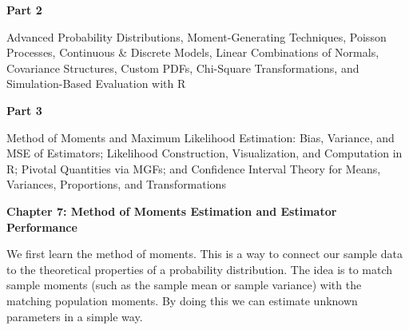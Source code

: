 \documentclass[11pt,letterpaper]{article}
\theoremstyle{remark}
\begin{document}
\newpage


\newpage

\thispagestyle{empty}
\vspace*{\fill}
\begin{center}
{\fontsize{80}{96}\selectfont \textbf{Part 2}}

\vspace{1cm}

{\large Advanced Probability Distributions, Moment-Generating Techniques, Poisson Processes, Continuous \& Discrete Models, Linear Combinations of Normals, Covariance Structures, Custom PDFs, Chi-Square Transformations, and Simulation-Based Evaluation with R}
\end{center}
\vspace*{\fill}

\newpage


\newpage

\thispagestyle{empty}
\vspace*{\fill}
\begin{center}
{\fontsize{80}{96}\selectfont \textbf{Part 3}}

\vspace{1cm}

{\large Method of Moments and Maximum Likelihood Estimation: Bias, Variance, and MSE of Estimators; Likelihood Construction, Visualization, and Computation in R; Pivotal Quantities via MGFs; and Confidence Interval Theory for Means, Variances, Proportions, and Transformations}
\end{center}
\vspace*{\fill}

\newpage


\textbf{Chapter 7: Method of Moments Estimation and Estimator Performance}

\vspace{0.5cm}

We first learn the method of moments. This is a way to connect our sample data to the theoretical properties of a probability distribution. The idea is to match sample moments (such as the sample mean or sample variance) with the matching population moments. By doing this we can estimate unknown parameters in a simple way.
\end{document}
